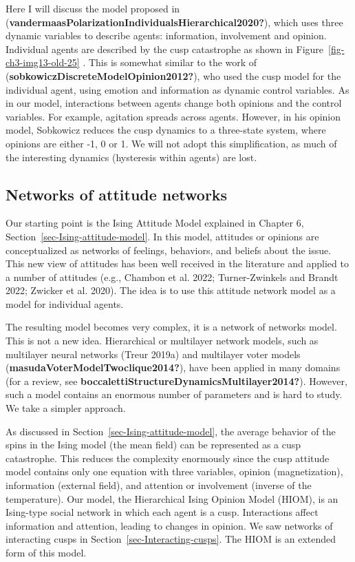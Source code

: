 \documentclass[
  a4paper,
  DIV=11,
  numbers=noendperiod,
  oneside]{scrreprt}
\begin{document}
Here I will discuss the model proposed in
(\textbf{vandermaasPolarizationIndividualsHierarchical2020?}), which
uses three dynamic variables to describe agents: information,
involvement and opinion. Individual agents are described by the cusp
catastrophe as shown in Figure~\ref{fig-ch3-img13-old-25} . This is
somewhat similar to the work of
(\textbf{sobkowiczDiscreteModelOpinion2012?}), who used the cusp model
for the individual agent, using emotion and information as dynamic
control variables. As in our model, interactions between agents change
both opinions and the control variables. For example, agitation spreads
across agents. However, in his opinion model, Sobkowicz reduces the cusp
dynamics to a three-state system, where opinions are either -1, 0 or 1.
We will not adopt this simplification, as much of the interesting
dynamics (hysteresis within agents) are lost.

\hypertarget{sec-Networks-of-attitude-networks}{%
\subsection{Networks of attitude
networks}\label{sec-Networks-of-attitude-networks}}

Our starting point is the Ising Attitude Model explained in Chapter 6,
Section~\ref{sec-Ising-attitude-model}. In this model, attitudes or
opinions are conceptualized as networks of feelings, behaviors, and
beliefs about the issue. This new view of attitudes has been well
received in the literature and applied to a number of attitudes (e.g.,
Chambon et al. 2022; Turner-Zwinkels and Brandt 2022; Zwicker et al.
2020). The idea is to use this attitude network model as a model for
individual agents.

The resulting model becomes very complex, it is a network of networks
model. This is not a new idea. Hierarchical or multilayer network
models, such as multilayer neural networks (Treur 2019a) and multilayer
voter models (\textbf{masudaVoterModelTwoclique2014?}), have been
applied in many domains (for a review, see
\textbf{boccalettiStructureDynamicsMultilayer2014?}). However, such a
model contains an enormous number of parameters and is hard to study. We
take a simpler approach.

As discussed in Section~\ref{sec-Ising-attitude-model}, the average
behavior of the spins in the Ising model (the mean field) can be
represented as a cusp catastrophe. This reduces the complexity
enormously since the cusp attitude model contains only one equation with
three variables, opinion (magnetization), information (external field),
and attention or involvement (inverse of the temperature). Our model,
the Hierarchical Ising Opinion Model (HIOM), is an Ising-type social
network in which each agent is a cusp. Interactions affect information
and attention, leading to changes in opinion. We saw networks of
interacting cusps in Section~\ref{sec-Interacting-cusps}. The HIOM is an
extended form of this model.
\end{document}
